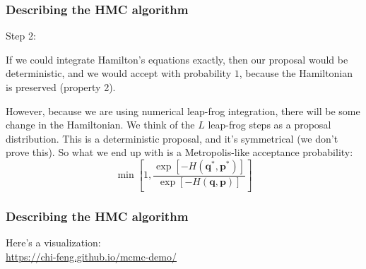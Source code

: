 \documentclass{beamer}
\begin{document}
\begin{frame}
\frametitle{Describing the HMC algorithm}

Step 2: 
\newline

If we could integrate Hamilton's equations exactly, then our proposal would be deterministic, and we would accept with probability $1$, because the Hamiltonian is preserved (property 2). 
\newline

However, because we are using numerical leap-frog integration, there will be some change in the Hamiltonian. We think of the $L$ leap-frog steps as a proposal distribution. This is a deterministic proposal, and it's symmetrical (we don't prove this). So what we end up with is a Metropolis-like acceptance probability:
$$
\min\left[1, \frac{\exp\left[ -H(\mathbf{q}^*,\mathbf{p}^*) \right]}{\exp\left[ -H(\mathbf{q},\mathbf{p}) \right] } \right]
$$



\end{frame}

\begin{frame}[fragile]
\frametitle{Describing the HMC algorithm}

Here's a visualization:\\
\url{https://chi-feng.github.io/mcmc-demo/}


\end{frame}
\end{document}
